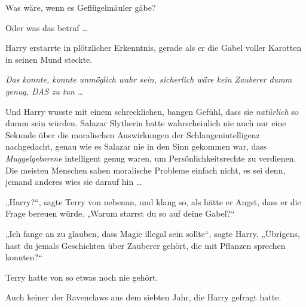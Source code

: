 Was wäre, wenn es Geflügelmäuler gäbe?

Oder was das betraf …

Harry erstarrte in plötzlicher Erkenntnis, gerade als er die Gabel voller Karotten in seinen Mund steckte.

\emph{Das konnte, konnte unmöglich wahr sein, sicherlich wäre kein Zauberer dumm genug, DAS zu tun …}

Und Harry wusste mit einem schrecklichen, bangen Gefühl, dass sie \emph{natürlich} so dumm sein würden. Salazar Slytherin hatte wahrscheinlich nie auch nur eine Sekunde über die moralischen Auswirkungen der Schlangenintelligenz nachgedacht, genau wie es Salazar nie in den Sinn gekommen war, dass \emph{Muggelgeborene} intelligent genug waren, um Persönlichkeitsrechte zu verdienen. Die meisten Menschen sahen moralische Probleme einfach nicht, es sei denn, jemand anderes wies sie darauf hin …

„Harry?“, sagte Terry von nebenan, und klang so, als hätte er Angst, dass er die Frage bereuen würde.
„Warum starrst du so auf deine Gabel?“

„Ich fange an zu glauben, dass Magie illegal sein sollte“, sagte Harry. „Übrigens, hast du jemals Geschichten über Zauberer gehört, die mit Pflanzen sprechen konnten?“

\later

Terry hatte von so etwas noch nie gehört.

Auch keiner der Ravenclaws aus dem siebten Jahr, die Harry gefragt hatte.

